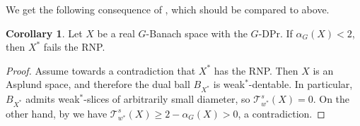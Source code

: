 \documentclass[a4paper,12pt]{amsart}
\theoremstyle{definition}
\newtheorem{corollary}[theorem]{Corollary}
\theoremstyle{definition}
\theoremstyle{remark}
\numberwithin{equation}{section}
\newcommand{\<}{\langle}
\renewcommand{\>}{\rangle}
\begin{document}
	
	
	
	We get the following consequence of , which should be compared to  above.
	
	\begin{corollary} Let $X$ be a real $G$-Banach space with the $G$-DPr. If $\alpha_G(X) < 2$, then $X^*$ fails the RNP.
	\end{corollary}
	
	
	\begin{proof}
		Assume towards a contradiction that $X^*$ has the RNP. Then $X$ is an Asplund space, and therefore the dual ball $B_{X^*}$ is weak$^*$-dentable. In particular, $B_{X^*}$ admits weak$^*$-slices of arbitrarily small diameter, so $\mathcal{T}_{w^*}^s(X)=0$. On the other hand, by  we have $\mathcal{T}_{w^*}^s(X)\ge 2-\alpha_G(X)>0$, a contradiction.
	\end{proof}
	
\end{document}
